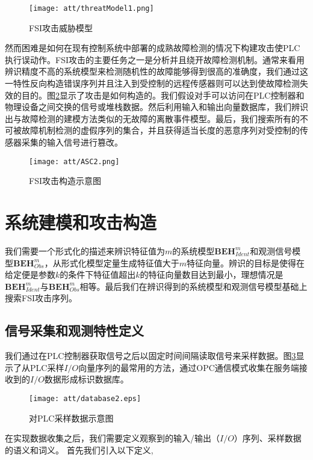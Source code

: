 \begin{figure}[!htb]
  \centering
  \texttt{[image: att/threatModel1.png]}
  \caption{FSI攻击威胁模型}
  \label{fig1}
\end{figure}

然而困难是如何在现有控制系统中部署的成熟故障检测的情况下构建攻击使PLC执行误动作。FSI攻击的主要任务之一是分析并且绕开故障检测机制。通常来看用辨识精度不高的系统模型来检测随机性的故障能够得到很高的准确度，我们通过这一特性反向构造错误序列并且注入到受控制的远程传感器则可以达到使故障检测失效的目的。图\ref {fig2}显示了攻击是如何构造的。我们假设对手可以访问在PLC控制器和物理设备之间交换的信号或堆栈数据。然后利用输入和输出向量数据库，我们辨识出与故障检测的建模方法类似的无故障的离散事件模型。最后，我们搜索所有的不可被故障机制检测的虚假序列的集合，并且获得适当长度的恶意序列对受控制的传感器采集的输入信号进行篡改。

\begin{figure}[!htb]
  \centering
  \texttt{[image: att/ASC2.png]}
  \caption{FSI攻击构造示意图}
  \label{fig2}
\end{figure}

\section{系统建模和攻击构造}
\label{sec:model}

我们需要一个形式化的描述来辨识特征值为$m$的系统模型$ \textbf{BEH}_{Ident}^m $和观测信号模型\( \textbf{BEH}_{Obs}^m \)，从形式化模型定量生成特征值大于$m$特征向量。辨识的目标是使得在给定便是参数$k$的条件下特征值超出$k$的特征向量数目达到最小，理想情况是$ \textbf{BEH}_{Ident}^m $与$\textbf{BEH}_{Obs}^m $相等。最后我们在辨识得到的系统模型和观测信号模型基础上搜索FSI攻击序列。

\subsection{信号采集和观测特性定义}

我们通过在PLC控制器获取信号之后以固定时间间隔读取信号来采样数据\cite {roth2012}。图\ref {fig3}显示了从PLC采样$I/O$向量序列的最常用的方法，通过OPC通信模式收集在服务端接收到的$I/O$数据形成标识数据库。

\begin{figure}[!htb]
  \centering
  \texttt{[image: att/database2.eps]}
  \caption{对PLC采样数据示意图}
  \label{fig3}
\end{figure}

在实现数据收集之后，我们需要定义观察到的输入/输出（$I/O$）序列、采样数据的语义和词义。 首先我们引入以下定义,

